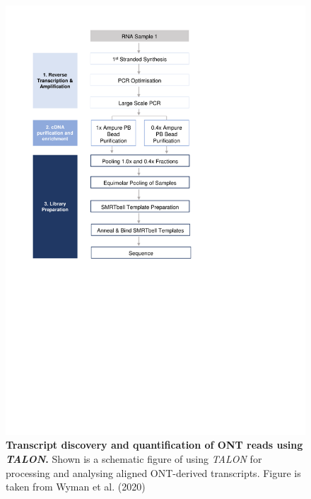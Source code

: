 \begin{figure}[htp]
	\centering
	\includegraphics[page=23,trim={0cm 11cm 0cm 2cm},clip,scale = 0.7]{Figures/ProjectDevelopment_Figures}
	\captionsetup{width=0.95\textwidth,singlelinecheck=off}
	\caption[Transcript discovery and quantification of ONT reads using \textit{TALON}]%
	{\textbf{Transcript discovery and quantification of ONT reads using \textit{TALON}.} Shown is a schematic figure of using \textit{TALON} for processing and analysing aligned ONT-derived transcripts. Figure is taken from Wyman et al. (2020)\cite{Wyman2019}  
	}
	\label{fig:ONT_Talon}
\end{figure}
